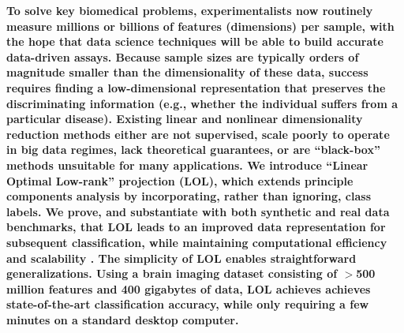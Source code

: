 \documentclass[11pt]{extarticle}
\begin{document}
\textbf{%
To solve key biomedical problems, experimentalists now routinely measure millions or billions of features (dimensions) per sample, with the hope that data science techniques will be able to build  accurate data-driven assays.  Because  sample sizes are typically  orders of magnitude smaller than the dimensionality of these data, success requires finding a low-dimensional representation that preserves the discriminating information (e.g., whether the individual suffers from a particular disease). 
Existing  linear  and nonlinear dimensionality reduction methods either are not supervised,  scale poorly to operate in big data regimes, lack theoretical guarantees, or are  ``black-box'' methods unsuitable for many applications. 
We introduce ``Linear Optimal Low-rank'' projection (LOL), which extends principle components analysis by incorporating, rather than ignoring, class labels. 
We prove, and substantiate with both synthetic and real data benchmarks, that LOL leads to an improved data representation  for subsequent classification, while maintaining computational efficiency and scalability . 
The simplicity of LOL enables straightforward generalizations.
Using a  brain imaging dataset consisting of $>$500 million features and 400 gigabytes of data,  LOL achieves achieves state-of-the-art classification accuracy, while only requiring a few minutes on a standard  desktop computer.
}
\end{document}
